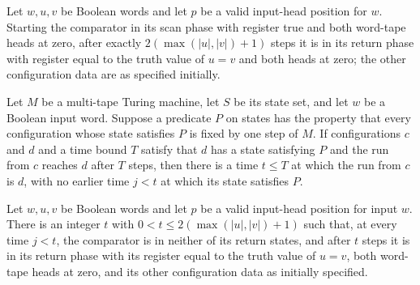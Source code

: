 \begin{lemma}
\label{Turing.FinTM.emitter_compare_run}
\leanok
{}
Let $w,u,v$ be Boolean words and let $p$ be a valid input-head position for $w$.
Starting the comparator in its scan phase with register true and both word-tape heads at
zero, after exactly $2(\max(|u|,|v|)+1)$ steps it is in its return phase with register
equal to the truth value of $u=v$ and both heads at zero; the other configuration data
are as specified initially.
\end{lemma}

\begin{lemma}
\label{Turing.FinTM.emitter_first_entry}
\leanok
{}
Let $M$ be a multi-tape Turing machine, let $S$ be its state set, and let $w$ be a
Boolean input word. Suppose a predicate $P$ on states has the property that every
configuration whose state satisfies $P$ is fixed by one step of $M$. If configurations
$c$ and $d$ and a time bound $T$ satisfy that $d$ has a state satisfying $P$ and the run
from $c$ reaches $d$ after $T$ steps, then there is a time $t\le T$ at which the run
from $c$ is $d$, with no earlier time $j<t$ at which its state satisfies $P$.
\end{lemma}

\begin{lemma}
\label{Turing.FinTM.emitter_compare_first}
\leanok
{}
Let $w,u,v$ be Boolean words and let $p$ be a valid input-head position for input $w$.
There is an integer $t$ with $0<t\le 2(\max(|u|,|v|)+1)$ such that, at every time $j<t$,
the comparator is in neither of its return states, and after $t$ steps it is in its
return phase with its register equal to the truth value of $u=v$, both word-tape heads
at zero, and its other configuration data as initially specified.
\end{lemma}

